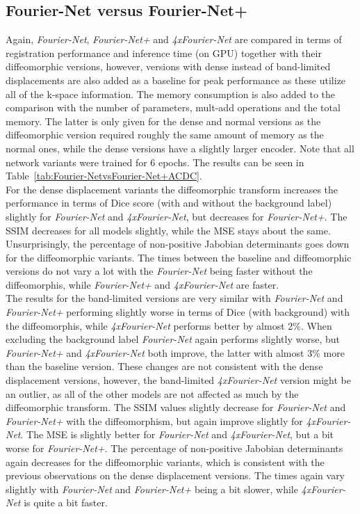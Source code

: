 \documentclass[english,version-2022-01]{uzl-thesis} %
\begin{document}
\subsection{Fourier-Net versus Fourier-Net+} \label{SubSec:ResultsFourier-NetvsFourier-Net+ACDC}
Again, \emph{Fourier-Net}, \emph{Fourier-Net+} and \emph{4xFourier-Net} are compared in terms of registration performance and inference time (on GPU) together with their diffeomorphic versions, however, versions with dense instead of band-limited displacements are also added as a baseline for peak performance as these utilize all of the k-space information. The memory consumption is also added to the comparison with the number of parameters, mult-add operations and the total memory. The latter is only given for the dense and normal versions as the diffeomorphic version required roughly the same amount of memory as the normal ones, while the dense versions have a slightly larger encoder. 
Note that all network variants were trained for 6 epochs. The results can be seen in Table~\ref{tab:Fourier-NetvsFourier-Net+ACDC}.\\
For the dense displacement variants the diffeomorphic transform increases the performance in terms of Dice score (with and without the background label) slightly for \emph{Fourier-Net} and \emph{4xFourier-Net}, but decreases for \emph{Fourier-Net+}. The SSIM decreases for all models slightly, while the MSE stays about the same. Unsurprisingly, the percentage of non-positive Jabobian determinants goes down for the diffeomorphic variants. The times between the baseline and diffeomorphic versions do not vary a lot with the \emph{Fourier-Net} being faster without the diffeomorphis, while \emph{Fourier-Net+} and \emph{4xFourier-Net} are faster. \\
The results for the band-limited versions are very similar with \emph{Fourier-Net} and \emph{Fourier-Net+} performing slightly worse in terms of Dice (with background) with the diffeomorphis, while \emph{4xFourier-Net} performs better by almost 2$\%$. When excluding the background label \emph{Fourier-Net} again performs slightly worse, but \emph{Fourier-Net+} and \emph{4xFourier-Net} both improve, the latter with almost 3$\%$ more than the baseline version. These changes are not consistent with the dense displacement versions, however, the band-limited \emph{4xFourier-Net} version might be an outlier, as all of the other models are not affected as much by the diffeomorphic transform. The SSIM values slightly decrease for \emph{Fourier-Net} and \emph{Fourier-Net+} with the diffeomorphism, but again improve slightly for \emph{4xFourier-Net}. The MSE is slightly better for \emph{Fourier-Net} and \emph{4xFourier-Net}, but a bit worse for \emph{Fourier-Net+}. The percentage of non-positive Jabobian determinants again decreases for the diffeomorphic variants, which is consistent with the previous observations on the dense displacement versions. The times again vary slightly with \emph{Fourier-Net} and \emph{Fourier-Net+} being a bit slower, while \emph{4xFourier-Net} is quite a bit faster.\\
\end{document}

